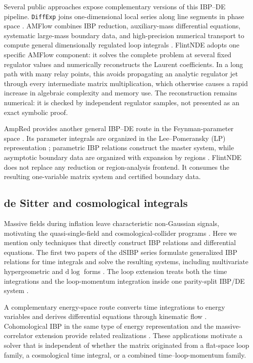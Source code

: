 \documentclass[11pt]{article}
\begin{document}
Several public approaches expose complementary versions of this IBP--DE pipeline.
\texttt{DiffExp} joins one-dimensional local series along line segments in phase space
\cite{Hidding:2020ytt}.  AMFlow combines IBP reduction, auxiliary-mass differential
equations, systematic large-mass boundary data, and high-precision numerical transport to
compute general dimensionally regulated loop integrals
\cite{Liu:2022chg,Huang:2026rjb}.  FlintNDE adopts
one specific AMFlow component: it solves the complete problem at several fixed regulator
values and numerically reconstructs the Laurent coefficients.  In a long path with many
relay points, this avoids propagating an analytic regulator jet through every intermediate
matrix multiplication, which otherwise causes a rapid increase in algebraic complexity and
memory use.  The reconstruction remains numerical: it is checked by independent regulator
samples, not presented as an exact symbolic proof.

AmpRed provides another general IBP--DE route in the Feynman-parameter space
\cite{Chen:2024xwt}.  Its parameter integrals are organized in the Lee--Pomeransky (LP)
representation \cite{Lee:2013hzt}; parametric IBP relations construct the master system,
while asymptotic boundary data are organized with expansion by regions
\cite{Beneke:1997zp,Pak:2010pt}.  FlintNDE does not replace any reduction or region-analysis
frontend.  It consumes the resulting one-variable matrix system and certified boundary
data.

\subsection{de Sitter and cosmological integrals}

Massive fields during inflation leave characteristic non-Gaussian signals, motivating the
quasi-single-field and cosmological-collider programs
\cite{Chen:2009we,Chen:2009zp,Arkani-Hamed:2015bza}.  Here we mention only techniques that
directly construct IBP relations and differential equations.  The first two papers of the
dSIBP series formulate generalized IBP relations for time integrals and solve the resulting
systems, including multivariate hypergeometric and $\mathrm d\log$ forms
\cite{Chen:2023iix,Chen:2024glu}.  The loop extension treats both the time integrations and
the loop-momentum integration inside one parity-split IBP/DE system
\cite{Chen:2026dqp}.

A complementary energy-space route converts time integrations to energy variables and
derives differential equations through kinematic flow
\cite{Arkani-Hamed:2023kig,Arkani-Hamed:2023bsv}.  Cohomological IBP in the same type of
energy representation and the massive-correlator extension provide related realizations
\cite{De:2023xue,Baumann:2026atn}.  These applications motivate a solver that is independent
of whether the matrix originated from a flat-space loop family, a cosmological time
integral, or a combined time--loop-momentum family.
\end{document}
